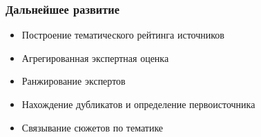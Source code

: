 \documentclass[hyperref={unicode}, 14pt, aspectratio=169]{beamer}
\begin{document}
\begin{frame}
    \frametitle{Дальнейшее развитие}

    \begin{block}{}
        \begin{itemize}
            \item Построение тематического рейтинга источников
            \item Агрегированная экспертная оценка
            \item Ранжирование экспертов
            \item Нахождение дубликатов и определение первоисточника
            \item Связывание сюжетов по тематике
        \end{itemize}
    \end{block}
\end{frame}
\end{document}
